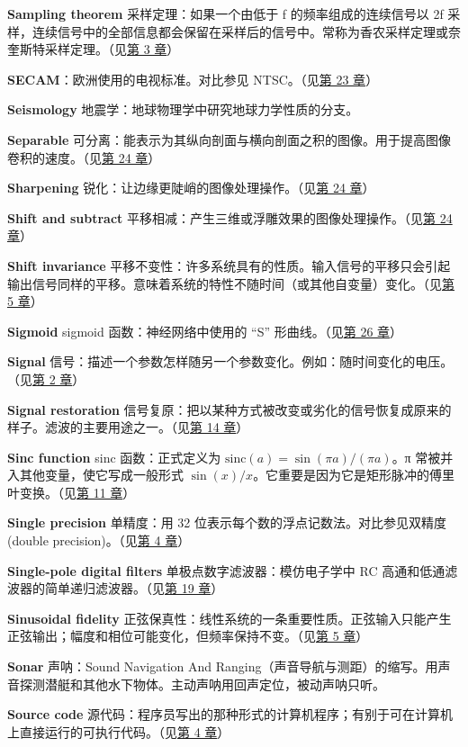 \textbf{Sampling theorem} 采样定理：如果一个由低于 f
的频率组成的连续信号以 2f
采样，连续信号中的全部信息都会保留在采样后的信号中。常称为香农采样定理或奈奎斯特采样定理。（见\hyperref[ch-03]{第
3 章}）

\textbf{SECAM}：欧洲使用的电视标准。对比参见
NTSC。（见\hyperref[ch-23]{第 23 章}）

\textbf{Seismology} 地震学：地球物理学中研究地球力学性质的分支。

\textbf{Separable}
可分离：能表示为其纵向剖面与横向剖面之积的图像。用于提高图像卷积的速度。（见\hyperref[ch-24]{第
24 章}）

\textbf{Sharpening}
锐化：让边缘更陡峭的图像处理操作。（见\hyperref[ch-24]{第 24 章}）

\textbf{Shift and subtract}
平移相减：产生三维或浮雕效果的图像处理操作。（见\hyperref[ch-24]{第 24
章}）

\textbf{Shift invariance}
平移不变性：许多系统具有的性质。输入信号的平移只会引起输出信号同样的平移。意味着系统的特性不随时间（或其他自变量）变化。（见\hyperref[ch-05]{第
5 章}）

\textbf{Sigmoid} sigmoid 函数：神经网络中使用的 ``S''
形曲线。（见\hyperref[ch-26]{第 26 章}）

\textbf{Signal}
信号：描述一个参数怎样随另一个参数变化。例如：随时间变化的电压。（见\hyperref[ch-02]{第
2 章}）

\textbf{Signal restoration}
信号复原：把以某种方式被改变或劣化的信号恢复成原来的样子。滤波的主要用途之一。（见\hyperref[ch-14]{第
14 章}）

\textbf{Sinc function} sinc 函数：正式定义为
\(\mathrm{sinc}(a) = \sin(\pi a)/(\pi a)\)。π
常被并入其他变量，使它写成一般形式
\(\sin(x)/x\)。它重要是因为它是矩形脉冲的傅里叶变换。（见\hyperref[ch-11]{第
11 章}）

\textbf{Single precision} 单精度：用 32
位表示每个数的浮点记数法。对比参见双精度(double
precision)。（见\hyperref[ch-04]{第 4 章}）

\textbf{Single-pole digital filters} 单极点数字滤波器：模仿电子学中 RC
高通和低通滤波器的简单递归滤波器。（见\hyperref[ch-19]{第 19 章}）

\textbf{Sinusoidal fidelity}
正弦保真性：线性系统的一条重要性质。正弦输入只能产生正弦输出；幅度和相位可能变化，但频率保持不变。（见\hyperref[ch-05]{第
5 章}）

\textbf{Sonar} 声呐：Sound Navigation And
Ranging（声音导航与测距）的缩写。用声音探测潜艇和其他水下物体。主动声呐用回声定位，被动声呐只听。

\textbf{Source code}
源代码：程序员写出的那种形式的计算机程序；有别于可在计算机上直接运行的可执行代码。（见\hyperref[ch-04]{第
4 章}）

